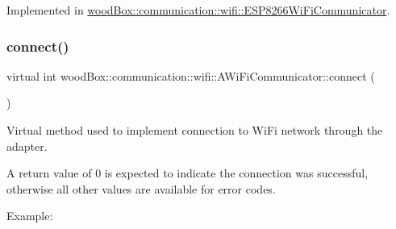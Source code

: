 Implemented in \mbox{\hyperlink{classwood_box_1_1communication_1_1wifi_1_1_e_s_p8266_wi_fi_communicator_aa73f46aaaf5441b79dd4a15be293aeb4}{wood\+Box\+::communication\+::wifi\+::\+E\+S\+P8266\+Wi\+Fi\+Communicator}}.

\mbox{\label{classwood_box_1_1communication_1_1wifi_1_1_a_wi_fi_communicator_a7c4763c1594a4b934e5a39e90b271799}} 
\subsubsection{\texorpdfstring{connect()}{connect()}}
{\footnotesize\ttfamily virtual int wood\+Box\+::communication\+::wifi\+::\+A\+Wi\+Fi\+Communicator\+::connect (\begin{DoxyParamCaption}{ }\end{DoxyParamCaption})\hspace{0.3cm}{\ttfamily [pure virtual]}}

Virtual method used to implement connection to Wi\+Fi network through the adapter.

A return value of 0 is expected to indicate the connection was successful, otherwise all other values are available for error codes.

Example\+:


